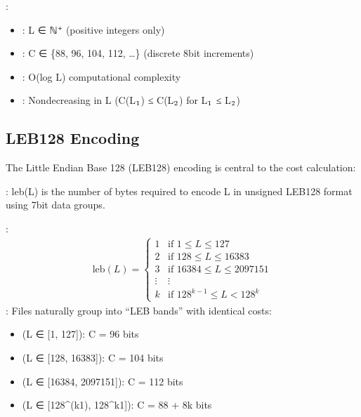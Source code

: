 \documentclass[letterpaper,10pt,english]{sphinxmanual}
\begin{document}
\sphinxAtStartPar
{}:
\begin{itemize}
\item {} 
\sphinxAtStartPar
{}: L ∈ ℕ⁺ (positive integers only)

\item {} 
\sphinxAtStartPar
{}: C ∈ \{88, 96, 104, 112, …\} (discrete 8\sphinxhyphen{}bit increments)

\item {} 
\sphinxAtStartPar
{}: O(log L) computational complexity

\item {} 
\sphinxAtStartPar
{}: Non\sphinxhyphen{}decreasing in L (C(L\(\sb{\text{1}}\)) ≤ C(L\(\sb{\text{2}}\)) for L\(\sb{\text{1}}\) ≤ L\(\sb{\text{2}}\))

\end{itemize}


\subsection{LEB128 Encoding}
\label{\detokenize{mathematical_foundation:leb128-encoding}}
\sphinxAtStartPar
The Little Endian Base 128 (LEB128) encoding is central to the cost calculation:

\sphinxAtStartPar
{}: leb(L) is the number of bytes required to encode L in unsigned LEB128 format using 7\sphinxhyphen{}bit data groups.

\sphinxAtStartPar
{}:
\begin{equation*}
\begin{split}\text{leb}(L) = \begin{cases}
1 & \text{if } 1 \leq L \leq 127 \\
2 & \text{if } 128 \leq L \leq 16383 \\
3 & \text{if } 16384 \leq L \leq 2097151 \\
\vdots & \vdots \\
k & \text{if } 128^{k-1} \leq L < 128^k
\end{cases}\end{split}
\end{equation*}
\sphinxAtStartPar
{}: Files naturally group into “LEB bands” with identical costs:
\begin{itemize}
\item {} 
\sphinxAtStartPar
{} (L ∈ {[}1, 127{]}): C = 96 bits

\item {} 
\sphinxAtStartPar
{} (L ∈ {[}128, 16383{]}): C = 104 bits

\item {} 
\sphinxAtStartPar
{} (L ∈ {[}16384, 2097151{]}): C = 112 bits

\item {} 
\sphinxAtStartPar
{} (L ∈ {[}128\textasciicircum{}(k\sphinxhyphen{}1), 128\textasciicircum{}k\sphinxhyphen{}1{]}): C = 88 + 8k bits

\end{itemize}
\end{document}
